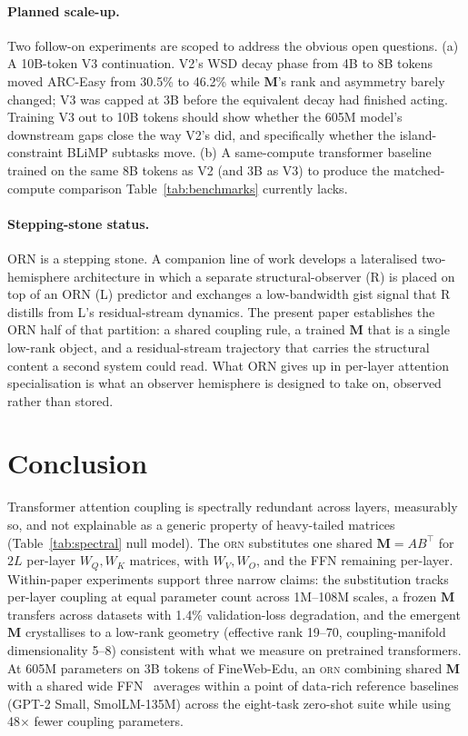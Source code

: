 \documentclass[10pt,twocolumn]{article}
\newcommand{\M}{\mathbf{M}}
\newcommand{\orn}{\textsc{orn}}
\begin{document}
\paragraph{Planned scale-up.}
Two follow-on experiments are scoped to address the obvious open questions.
(a) A 10B-token V3 continuation. V2's WSD decay phase from 4B to 8B tokens moved ARC-Easy from 30.5\% to 46.2\% while $\M$'s rank and asymmetry barely changed; V3 was capped at 3B before the equivalent decay had finished acting. Training V3 out to 10B tokens should show whether the 605M model's downstream gaps close the way V2's did, and specifically whether the island-constraint BLiMP subtasks move.
(b) A same-compute transformer baseline trained on the same 8B tokens as V2 (and 3B as V3) to produce the matched-compute comparison Table~\ref{tab:benchmarks} currently lacks.

\paragraph{Stepping-stone status.}
ORN is a stepping stone. A companion line of work develops a lateralised two-hemisphere architecture in which a separate structural-observer (R) is placed on top of an ORN (L) predictor and exchanges a low-bandwidth gist signal that R distills from L's residual-stream dynamics. The present paper establishes the ORN half of that partition: a shared coupling rule, a trained $\M$ that is a single low-rank object, and a residual-stream trajectory that carries the structural content a second system could read. What ORN gives up in per-layer attention specialisation is what an observer hemisphere is designed to take on, observed rather than stored.


\section{Conclusion}

Transformer attention coupling is spectrally redundant across layers, measurably so, and not explainable as a generic property of heavy-tailed matrices (Table~\ref{tab:spectral} null model).
The \orn{} substitutes one shared $\M = AB^\top$ for $2L$ per-layer $W_Q, W_K$ matrices, with $W_V, W_O$, and the FFN remaining per-layer. Within-paper experiments support three narrow claims: the substitution tracks per-layer coupling at equal parameter count across 1M--108M scales, a frozen $\M$ transfers across datasets with 1.4\% validation-loss degradation, and the emergent $\M$ crystallises to a low-rank geometry (effective rank 19--70, coupling-manifold dimensionality 5--8) consistent with what we measure on pretrained transformers. At 605M parameters on 3B tokens of FineWeb-Edu, an \orn{} combining shared $\M$ with a shared wide FFN~\cite{onewideffn2023} averages within a point of data-rich reference baselines (GPT-2 Small, SmolLM-135M) across the eight-task zero-shot suite while using 48$\times$ fewer coupling parameters.
\end{document}
